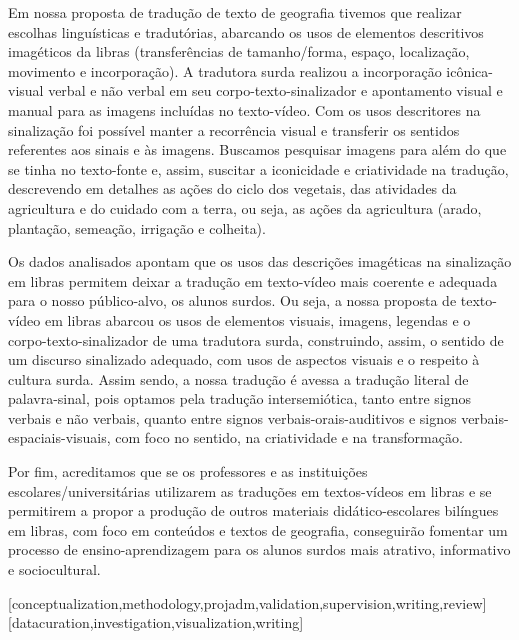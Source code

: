 \documentclass[portuguese]{textolivre}
\begin{document}
Em nossa proposta de tradução de texto de geografia tivemos que realizar escolhas linguísticas e tradutórias, abarcando os usos de elementos descritivos imagéticos da libras (transferências de tamanho/forma, espaço, localização, movimento e incorporação). A tradutora surda realizou a incorporação icônica-visual verbal e não verbal em seu corpo-texto-sinalizador e apontamento visual e manual para as imagens incluídas no texto-vídeo. Com os usos descritores na sinalização foi possível manter a recorrência visual e transferir os sentidos referentes aos sinais e às imagens. Buscamos pesquisar imagens para além do que se tinha no texto-fonte e, assim, suscitar a iconicidade e criatividade na tradução, descrevendo em detalhes as ações do ciclo dos vegetais, das atividades da agricultura e do cuidado com a terra, ou seja, as ações da agricultura (arado, plantação, semeação, irrigação e colheita).

Os dados analisados apontam que os usos das descrições imagéticas na sinalização em libras permitem deixar a tradução em texto-vídeo mais coerente e adequada para o nosso público-alvo, os alunos surdos. Ou seja, a nossa proposta de texto-vídeo em libras abarcou os usos de elementos visuais, imagens, legendas e o corpo-texto-sinalizador de uma tradutora surda, construindo, assim, o sentido de um discurso sinalizado adequado, com usos de aspectos visuais e o respeito à cultura surda. Assim sendo, a nossa tradução é avessa a tradução literal de palavra-sinal, pois optamos pela tradução intersemiótica, tanto entre signos verbais e não verbais, quanto entre signos verbais-orais-auditivos e signos verbais-espaciais-visuais, com foco no sentido, na criatividade e na transformação.

Por fim, acreditamos que se os professores e as instituições escolares/universitárias utilizarem as traduções em textos-vídeos em libras e se permitirem a propor a produção de outros materiais didático-escolares bilíngues em libras, com foco em conteúdos e textos de geografia, conseguirão fomentar um processo de ensino-aprendizagem para os alunos surdos mais atrativo, informativo e sociocultural.


\printbibliography\label{sec-bib}


\begin{contributors}
[conceptualization,methodology,projadm,validation,supervision,writing,review]
[datacuration,investigation,visualization,writing]
\end{contributors}
\end{document}
